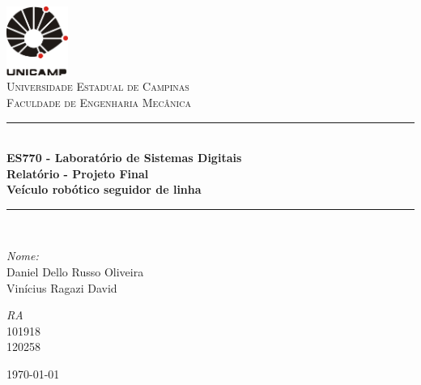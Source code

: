 \begin{titlepage}
\begin{center}

\newcommand{\HRule}{\rule{\linewidth}{0.5mm}}
\includegraphics[width=0.15\textwidth]{logoUnicamp}~\\[1cm]

\textsc{\LARGE Universidade Estadual de Campinas}\\[1.5cm]

\textsc{\Large Faculdade de Engenharia Mecânica}\\[0.5cm]

\HRule \\[0.4cm]
{ \huge \bfseries ES770 - Laboratório de Sistemas Digitais\\ \vspace{1cm} Relatório - Projeto Final\\
\Large{Veículo robótico seguidor de linha} \\[0.4cm] }

\HRule \\[1.5cm]

\begin{minipage}{0.6\textwidth}
\begin{flushleft} \large
\emph{Nome:}\\
Daniel Dello Russo Oliveira\\Vinícius Ragazi David
\end{flushleft}
\end{minipage}
\begin{minipage}{0.2\textwidth}
\begin{flushright} \large
\emph{RA}\\ 101918\\120258
\end{flushright}
\end{minipage}

\vfill

{\large \today}

\end{center}
\end{titlepage}
